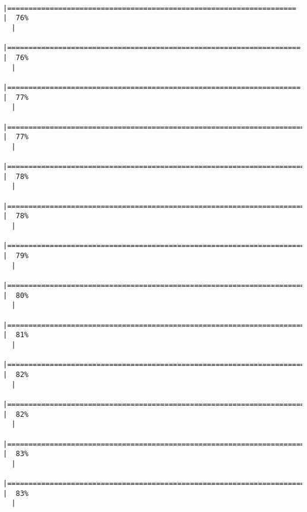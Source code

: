 \documentclass[12pt]{article}
\begin{document}
\begin{verbatim}
  |====================================================================                      |  76%
  |                                                                                                
  |=====================================================================                     |  76%
  |                                                                                                
  |=====================================================================                     |  77%
  |                                                                                                
  |======================================================================                    |  77%
  |                                                                                                
  |======================================================================                    |  78%
  |                                                                                                
  |=======================================================================                   |  78%
  |                                                                                                
  |=======================================================================                   |  79%
  |                                                                                                
  |========================================================================                  |  80%
  |                                                                                                
  |=========================================================================                 |  81%
  |                                                                                                
  |=========================================================================                 |  82%
  |                                                                                                
  |==========================================================================                |  82%
  |                                                                                                
  |==========================================================================                |  83%
  |                                                                                                
  |===========================================================================               |  83%
  |                                                                                                

\end{verbatim}
\end{document}

